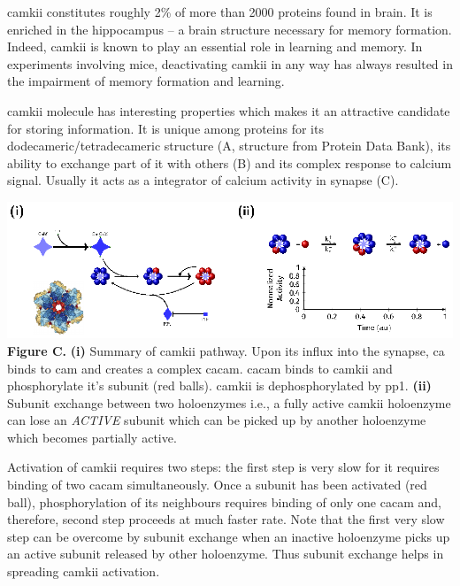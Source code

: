 \documentclass[]{resonance}
\begin{document}
 {

    \gls{camkii} constitutes roughly 2\% of more than 2000 proteins found in
    brain. It is enriched in the hippocampus -- a brain structure necessary for
    memory formation. Indeed, \gls{camkii} is known to play an essential role in
    learning and memory. In experiments involving mice, deactivating
    \gls{camkii} in any way has always resulted in the impairment of memory
    formation and learning. 

    \gls{camkii} molecule has interesting properties which makes it an
    attractive candidate for storing information. It is unique among proteins
    for its dodecameric/tetradecameric structure (A, structure from Protein Data Bank),
    its ability to exchange part of it with others (B) and its complex response
    to calcium signal.  Usually it acts as a integrator of calcium activity in
    synapse (C).

    \vspace{2mm}
    \includegraphics[width=0.9\linewidth]{./camkii_properties.eps} \\
    \textbf{Figure C.} \textbf{(i)} Summary of \gls{camkii} pathway. Upon its influx into
    the synapse, \gls{ca} binds to \gls{cam} and creates a complex \gls{cacam}.
    \gls{cacam} binds to \gls{camkii} and phosphorylate it's subunit (red
    balls). \gls{camkii} is dephosphorylated by \gls{pp1}. \textbf{(ii)} Subunit
    exchange between two holoenzymes i.e., a fully active \gls{camkii} holoenzyme
    can lose an \textit{ACTIVE} subunit which can be picked up by another
    holoenzyme which becomes partially active. 
    
    \vspace{2mm}
    Activation of \gls{camkii} requires two steps: the first step is very slow
    for it requires binding of two \gls{cacam} simultaneously. Once a subunit
    has been activated (red ball), phosphorylation of its neighbours requires
    binding of only one \gls{cacam} and, therefore, second step proceeds at  much
    faster rate.  Note that the first very slow step can be overcome by subunit
    exchange when an inactive holoenzyme picks up an active subunit released by
    other holoenzyme. Thus subunit exchange helps in spreading \gls{camkii}
    activation. 

}
\end{document}
